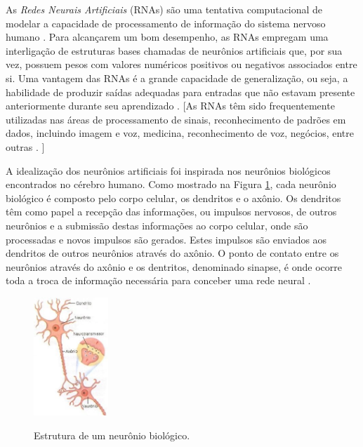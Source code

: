 
As \emph{Redes Neurais Artificiais} (RNAs) são uma tentativa computacional de modelar a capacidade de processamento de informação do sistema nervoso humano \cite{rojas}. Para alcançarem um bom desempenho, as RNAs empregam uma interligação de estruturas bases chamadas de neurônios artificiais que, por sua vez, possuem pesos com valores numéricos positivos ou negativos associados entre si. Uma vantagem das RNAs é a grande capacidade de generalização, ou seja, a habilidade de produzir saídas adequadas para entradas que não estavam presente anteriormente durante seu aprendizado \cite{haykin}. [As RNAs têm sido frequentemente utilizadas nas áreas de processamento de sinais, reconhecimento de padrões em dados, incluindo imagem e voz, medicina, reconhecimento de voz, negócios, entre outras \cite{fausett}. ]

A idealização dos neurônios artificiais foi inspirada nos neurônios biológicos encontrados no cérebro humano. Como mostrado na Figura \ref{fig:sinapse}, cada neurônio biológico é composto pelo corpo celular, os dendritos e o axônio. Os dendritos têm como papel a recepção das informações, ou impulsos nervosos, de outros neurônios e a submissão destas informações ao corpo celular, onde são processadas e novos impulsos são gerados. Estes impulsos são enviados aos dendritos de outros neurônios através do axônio. O ponto de contato entre os neurônios através do axônio e os dentritos, denominado sinapse, é onde ocorre toda a troca de informação necessária para conceber uma rede neural \cite{braga}.

\begin{figure}[h!]
\centering
\caption{Estrutura de um neurônio biológico.}
\includegraphics[width=0.25\textwidth]{imgs/sinapse}
\label{fig:sinapse}
\end{figure}

